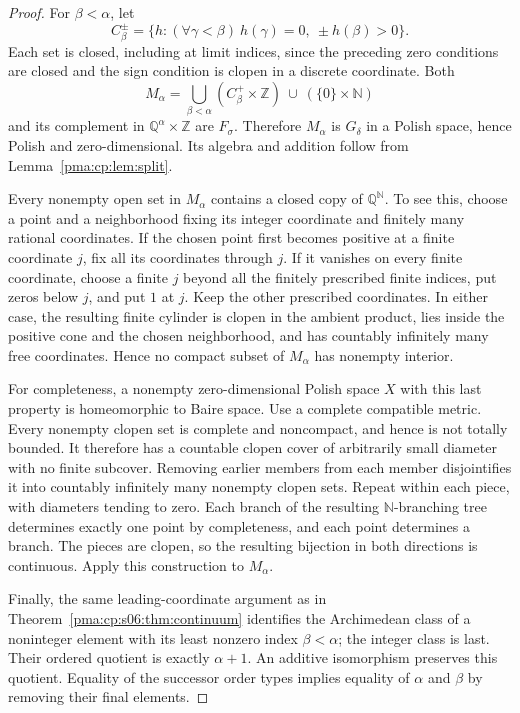 \documentclass[11pt]{article}
\numberwithin{equation}{section}
\theoremstyle{definition}
\theoremstyle{remark}
\newcommand{\N}{\mathbb N}
\newcommand{\Z}{\mathbb Z}
\newcommand{\Q}{\mathbb Q}
\begin{document}
\begin{proof}
For $\beta<\alpha$, let
\[
 C_\beta^\pm=\{h:(\forall\gamma<\beta)\ h(\gamma)=0,
                         \ \pm h(\beta)>0\}.
\]
Each set is closed, including at limit indices, since the preceding
zero conditions are closed and the sign condition is clopen in a
discrete coordinate. Both
\[
 M_\alpha=\bigcup_{\beta<\alpha}(C_\beta^+\times\Z)
                  \ \cup\ (\{0\}\times\N)
\]
and its complement in $\Q^\alpha\times\Z$ are $F_\sigma$. Therefore
$M_\alpha$ is $G_\delta$ in a Polish space, hence Polish and
zero-dimensional. Its algebra and addition follow from
Lemma~\ref{pma:cp:lem:split}.

Every nonempty open set in $M_\alpha$ contains a closed copy of
$\Q^{\N}$. To see this, choose a point and a neighborhood fixing its
integer coordinate and finitely many rational coordinates. If the
chosen point first becomes positive at a finite coordinate $j$, fix
all its coordinates through $j$. If it vanishes on every finite
coordinate, choose a finite $j$ beyond all the finitely prescribed
finite indices, put zeros below $j$, and put $1$ at $j$. Keep the other
prescribed coordinates. In either case, the resulting finite cylinder
is clopen in the ambient product, lies inside the positive cone and
the chosen neighborhood, and has countably infinitely many free
coordinates. Hence no compact subset of $M_\alpha$ has nonempty
interior.

For completeness, a nonempty zero-dimensional Polish space $X$ with
this last property is homeomorphic to Baire space. Use a complete
compatible metric. Every nonempty clopen set is complete and
noncompact, and hence is not totally bounded. It therefore has a
countable clopen cover of arbitrarily small diameter with no finite
subcover. Removing earlier members from each member disjointifies it
into countably infinitely many nonempty clopen sets. Repeat within
each piece, with diameters tending to zero. Each branch of the
resulting $\N$-branching tree determines exactly one point by
completeness, and each point determines a branch. The pieces are
clopen, so the resulting bijection in both directions is continuous.
Apply this construction to $M_\alpha$.

Finally, the same leading-coordinate argument as in
Theorem~\ref{pma:cp:s06:thm:continuum} identifies the Archimedean class of a
noninteger element with its least nonzero index $\beta<\alpha$; the
integer class is last. Their ordered quotient is exactly $\alpha+1$.
An additive isomorphism preserves this quotient. Equality of the
successor order types implies equality of $\alpha$ and $\beta$ by
removing their final elements.
\end{proof}
\end{document}

